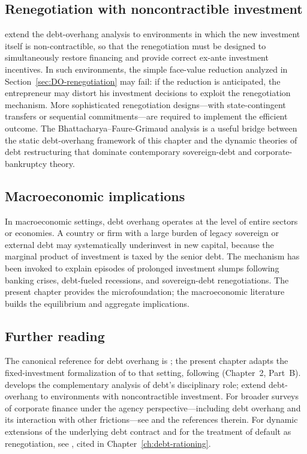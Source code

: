 \documentclass[11pt,a4paper,oneside]{book}
\theoremstyle{plain}
\theoremstyle{definition}
\theoremstyle{remark}
\numberwithin{equation}{chapter}
\begin{document}
\subsection{Renegotiation with noncontractible investment}

\citet{BhattacharyaFaureGrimaud2001} extend the debt-overhang analysis to environments in which the new investment itself is non-contractible, so that the renegotiation must be designed to simultaneously restore financing and provide correct ex-ante investment incentives.
In such environments, the simple face-value reduction analyzed in Section~\ref{sec:DO-renegotiation} may fail: if the reduction is anticipated, the entrepreneur may distort his investment decisions to exploit the renegotiation mechanism.
More sophisticated renegotiation designs---with state-contingent transfers or sequential commitments---are required to implement the efficient outcome.
The Bhattacharya--Faure-Grimaud analysis is a useful bridge between the static debt-overhang framework of this chapter and the dynamic theories of debt restructuring that dominate contemporary sovereign-debt and corporate-bankruptcy theory.

\subsection{Macroeconomic implications}

In macroeconomic settings, debt overhang operates at the level of entire sectors or economies.
A country or firm with a large burden of legacy sovereign or external debt may systematically underinvest in new capital, because the marginal product of investment is taxed by the senior debt.
The mechanism has been invoked to explain episodes of prolonged investment slumps following banking crises, debt-fueled recessions, and sovereign-debt renegotiations.
The present chapter provides the microfoundation; the macroeconomic literature builds the equilibrium and aggregate implications.

\subsection{Further reading}

The canonical reference for debt overhang is \citet{Myers1977}; the present chapter adapts the fixed-investment formalization of \citet{HolmstromTirole1997} to that setting, following \citet{Tirole2006} (Chapter~2, Part~B).
\citet{HartMoore1995} develops the complementary analysis of debt's disciplinary role; \citet{BhattacharyaFaureGrimaud2001} extend debt-overhang to environments with noncontractible investment.
For broader surveys of corporate finance under the agency perspective---including debt overhang and its interaction with other frictions---see \citet{Tirole2006} and the references therein.
For dynamic extensions of the underlying debt contract and for the treatment of default as renegotiation, see \citet{HartMoore1998}, cited in Chapter~\ref{ch:debt-rationing}.
\end{document}
